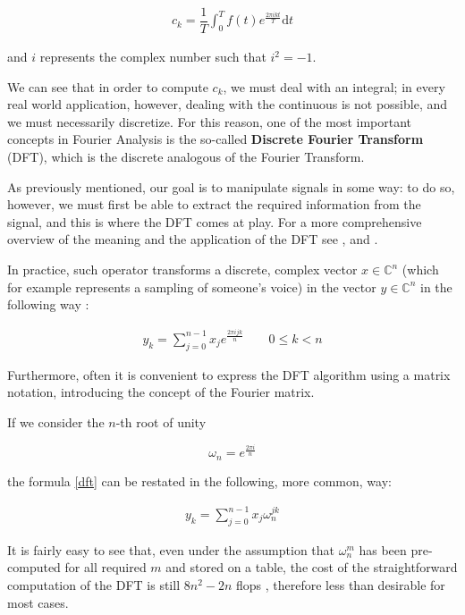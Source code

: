 \documentclass[a4paper,11pt]{article}
\newcommand{\C}{\mathbb{C}}
\begin{document}
\begin{align}
\label{coeff} c_k = \dfrac{1}{T} \int_0^T f(t) e^{\frac{2\pi i k t}{T}} \mathrm{d}t
\end{align}

and $i$ represents the complex number such that $i^2 = -1$.

We can see that in order to compute $c_k$, we must deal with an integral; in every real world application, however, dealing with the continuous is not possible, and we must necessarily discretize. For this reason, one of the most important concepts in Fourier Analysis is the so-called \textbf{Discrete Fourier Transform} (DFT), which is the discrete analogous of the Fourier Transform.

As previously mentioned, our goal is to manipulate signals in some way: to do so, however, we must first be able to extract the required information from the signal, and this is where the DFT comes at play. For a more comprehensive overview of the meaning and the application of the DFT see \citep[p.~151]{parsc}, and \citep{hunt}.

In practice, such operator transforms a discrete, complex vector $x \in \C^n$ (which for example represents a sampling of someone's voice) in the vector $y \in \C^n$ in the following way \citep[p.101]{parsc}:

\begin{align}
 \label{dft} y_k = \sum_{j=0}^{n-1} x_j  e^{\frac{2\pi ijk}{n}} \qquad 0 \leq k < n
\end{align}

Furthermore, often it is convenient to express the DFT algorithm using a matrix notation, introducing the concept of the Fourier matrix\citep{tesi,parsc}.

If we consider the $n$-th root of unity

$$\omega_n =  e^{\frac{2\pi i}{n}}$$

the formula \eqref{dft} can be restated in the following, more common, way:

\begin{align}
 \label{dft2} y_k = \sum_{j=0}^{n-1} x_j  \omega_n^{jk}
\end{align}

It is fairly easy to see that, even under the assumption that $\omega_n^m$ has been pre-computed for all required $m$ and stored on a table, the cost of the straightforward computation of the DFT is still $8n^2-2n$ flops \citep[p.~102]{parsc}, therefore less than desirable for most cases.
\end{document}
